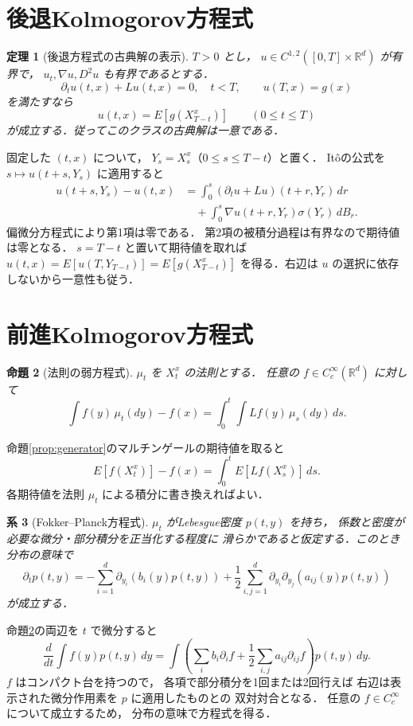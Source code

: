 \documentclass[a5paper,10pt,onecolumn]{jsarticle}
\makeatletter
\theoremstyle{mathnotetheorem}
\newtheorem{theorem}{定理}[section]
\newtheorem{proposition}[theorem]{命題}
\newtheorem{corollary}[theorem]{系}
\renewcommand{\proofname}{証明}
\renewenvironment{proof}[1][\proofname]{%
  \par\pushQED{\qed}\normalfont\topsep4\p@\@plus2\p@\relax
  \trivlist\item[\hskip\labelsep\bfseries #1]\ignorespaces
}{\popQED\endtrivlist\@endpefalse}
\makeatother
\begin{document}
\section{後退Kolmogorov方程式}

\begin{theorem}[後退方程式の古典解の表示]
\label{thm:backward}
$T>0$ とし，
$u\in C^{1,2}([0,T]\times\mathbb R^d)$ が有界で，
$u_t,\nabla u,D^2u$ も有界であるとする．
\[
 \partial_tu(t,x)+Lu(t,x)=0,\quad t<T,
 \qquad u(T,x)=g(x)
\]
を満たすなら
\[
 u(t,x)=E[g(X_{T-t}^x)]
 \qquad(0\le t\le T)
\]
が成立する．従ってこのクラスの古典解は一意である．
\end{theorem}
\begin{proof}
固定した $(t,x)$ について，
$Y_s=X_s^x$（$0\le s\le T-t$）と置く．
It\^oの公式を $s\mapsto u(t+s,Y_s)$ に適用すると
\begin{align*}
 u(t+s,Y_s)-u(t,x)
 &=\int_0^s(\partial_tu+Lu)(t+r,Y_r)\,dr\\
 &\quad+\int_0^s\nabla u(t+r,Y_r)
     \sigma(Y_r)\,dB_r.
\end{align*}
偏微分方程式により第1項は零である．
第2項の被積分過程は有界なので期待値は零となる．
$s=T-t$ と置いて期待値を取れば
$u(t,x)=E[u(T,Y_{T-t})]=E[g(X_{T-t}^x)]$
を得る．右辺は $u$ の選択に依存しないから一意性も従う．
\end{proof}

\section{前進Kolmogorov方程式}

\begin{proposition}[法則の弱方程式]\label{prop:forward-weak}
$\mu_t$ を $X_t^x$ の法則とする．
任意の $f\in C_c^\infty(\mathbb R^d)$ に対して
\[
 \int f(y)\,\mu_t(dy)-f(x)
 =\int_0^t\int Lf(y)\,\mu_s(dy)\,ds.
\]
\end{proposition}
\begin{proof}
命題\ref{prop:generator}のマルチンゲールの期待値を取ると
\[
 E[f(X_t^x)]-f(x)
 =\int_0^tE[Lf(X_s^x)]\,ds.
\]
各期待値を法則 $\mu_t$ による積分に書き換えればよい．
\end{proof}

\begin{corollary}[Fokker--Planck方程式]\label{cor:fokker}
$\mu_t$ がLebesgue密度 $p(t,y)$ を持ち，
係数と密度が必要な微分・部分積分を正当化する程度に
滑らかであると仮定する．このとき分布の意味で
\[
 \partial_tp(t,y)
 =-\sum_{i=1}^d\partial_{y_i}(b_i(y)p(t,y))
  +\frac12\sum_{i,j=1}^d
    \partial_{y_i}\partial_{y_j}(a_{ij}(y)p(t,y))
\]
が成立する．
\end{corollary}
\begin{proof}
命題\ref{prop:forward-weak}の両辺を $t$ で微分すると
\[
 \frac d{dt}\int f(y)p(t,y)\,dy
 =\int\left(
 \sum_i b_i\partial_if+\frac12\sum_{i,j}a_{ij}\partial_{ij}f
 \right)p(t,y)\,dy.
\]
$f$ はコンパクト台を持つので，
各項で部分積分を1回または2回行えば
右辺は表示された微分作用素を $p$ に適用したものとの
双対対合となる．
任意の $f\in C_c^\infty$ について成立するため，
分布の意味で方程式を得る．
\end{proof}
\end{document}
